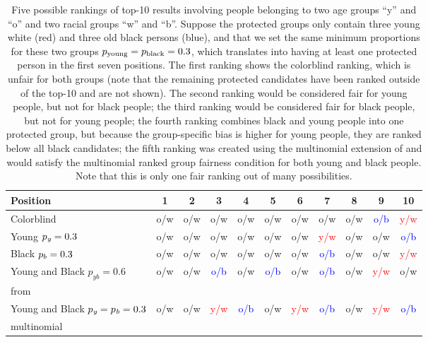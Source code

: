 \begin{table}[t]
	\caption[Introductory example for the extension of \algoFAIR to multiple protected groups]{Five possible rankings of top-10 results involving people belonging to two age groups ``y'' and ``o'' and two racial groups ``w'' and ``b''. 
		Suppose the protected groups only contain three young white (red) and three old black persons (blue), and that we set the same minimum proportions for these two groups $p_{\text{young}} = p_{\text{black}} = 0.3$, which translates into having at least one protected person in the first seven positions. 
		The first ranking shows the colorblind ranking, which is unfair for both groups (note that the remaining protected candidates have been ranked outside of the top-10 and are not shown).
		The second ranking would be considered fair for young people, but not for black people; the third ranking would be considered fair for black people, but not for young people; the fourth ranking combines black and young people into one protected group, but because the group-specific bias is higher for young people, they are ranked below all black candidates; the fifth ranking was created using the multinomial extension of \algoFAIR and would satisfy the multinomial ranked group fairness condition for both young and black people.
		Note that this is only one fair ranking out of many possibilities.
		\label{tbl:multinomial_intro_example}}	
	\centering\begin{tabular}{lcccccccccc}\toprule
		Position & 1 &2 & 3 &4& 5& 6& 7& 8& 9& 10  \\
		\midrule
		\rowcolor[HTML]{C0C0C0}
		Colorblind & o/w & o/w & o/w & o/w & o/w & o/w & o/w & o/w & \textcolor{blue}{o/b} & \textcolor{red}{y/w} \\
		Young $p_\textit{y}=0.3$ & o/w &o/w& o/w& o/w& o/w& o/w& \textcolor{red}{y/w}& o/w & o/w & \textcolor{blue}{o/b} \\
		\rowcolor[HTML]{C0C0C0}
		Black $p_b=0.3$ & o/w &o/w &o/w& o/w &o/w &o/w& \textcolor{blue}{o/b}& o/w& o/w& \textcolor{red}{y/w} \\
		Young and Black $p_{\textit{yb}}=0.6$& o/w &o/w& \textcolor{blue}{o/b} & o/w& \textcolor{blue}{o/b}& o/w & \textcolor{blue}{o/b}& o/w& \textcolor{red}{y/w}& o/w \\
		\algoFAIR from~\cite{zehlike2017fair} &&&&&&&&&&\\
		\rowcolor[HTML]{C0C0C0}
		Young and Black $p_{\textit{y}} = p_{\textit{b}} = 0.3$& o/w& o/w &\textcolor{red}{y/w}& \textcolor{blue}{o/b}& o/w& \textcolor{red}{y/w} &\textcolor{blue}{o/b}& o/w& \textcolor{red}{y/w}& \textcolor{blue}{o/b} \\
		\rowcolor[HTML]{C0C0C0}
		multinomial \algoFAIR &&&&&&&&&&\\
		\bottomrule
	\end{tabular}
\end{table}

